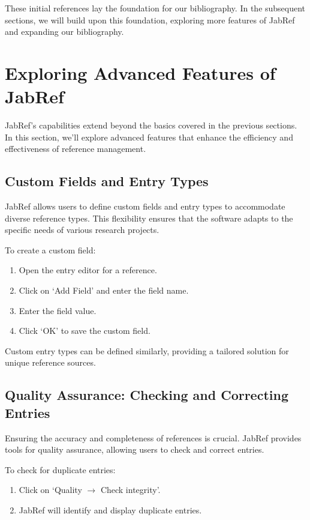 				These initial references lay the foundation for our bibliography. 
				In the subsequent sections, we will build upon this foundation, exploring more features of JabRef and expanding our bibliography.

	\section{Exploring Advanced Features of JabRef}
		JabRef's capabilities extend beyond the basics covered in the previous sections. 
		In this section, we'll explore advanced features that enhance the efficiency and effectiveness of reference management.
		\subsection{Custom Fields and Entry Types}
			JabRef allows users to define custom fields and entry types to accommodate diverse reference types. 
			This flexibility ensures that the software adapts to the specific needs of various research projects.
			
			To create a custom field:
			\begin{enumerate}
				\item Open the entry editor for a reference.
				\item Click on `Add Field' and enter the field name.
				\item Enter the field value.
				\item Click `OK' to save the custom field.
			\end{enumerate}
			
			Custom entry types can be defined similarly, providing a tailored solution for unique reference sources.

		\subsection{Quality Assurance: Checking and Correcting Entries}

			Ensuring the accuracy and completeness of references is crucial. JabRef provides tools for quality assurance, allowing users to check and correct entries.

			To check for duplicate entries:
			\begin{enumerate}
				\item Click on `Quality $\rightarrow$ Check integrity'.
				\item JabRef will identify and display duplicate entries.
			\end{enumerate}
			
